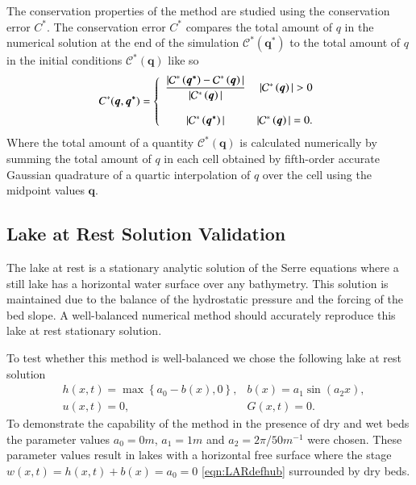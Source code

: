 \documentclass[times]{elsarticle}
\newcommand{\vecn}[1]{\boldsymbol{#1}}
\begin{document}
The conservation properties of the method are studied using the conservation error $C^*$. The conservation error $C^*$ compares the total amount of $q$ in the numerical solution at the end of the simulation $\mathcal{C}^*\left({\vecn{q^*}}\right)$ to the total amount of $q$ in the initial conditions $\mathcal{C}^*\left({\vecn{q}}\right)$ like so
\begin{equation*}
C^*(\vecn{q},\vecn{q^*}) =  \left\lbrace \begin{array}{c r} 
\dfrac{|\mathcal{C}^*\left({\vecn{q^*}}\right) - \mathcal{C}^*\left({\vecn{q}}\right)| }{|\mathcal{C}^*\left({\vecn{q}}\right)|} & |\mathcal{C}^*\left({\vecn{q}}\right)| > 0 \\ \\
|\mathcal{C}^*\left({\vecn{q^*}}\right)| & |\mathcal{C}^*\left({\vecn{q}}\right)| = 0  . \end{array}\right. 
\end{equation*}
Where the total amount of a quantity $\mathcal{C}^*\left({\vecn{q}}\right)$ is calculated numerically by summing the total amount of $q$ in each cell obtained by fifth-order accurate Gaussian quadrature of a quartic interpolation of $q$ over the cell using the midpoint values ${\vecn{q}}$. 

\subsection{Lake at Rest Solution Validation}
The lake at rest is a stationary analytic solution of the Serre equations where a still lake has a horizontal water surface over any bathymetry. This solution is maintained due to the balance of the hydrostatic pressure and the forcing of the bed slope. A well-balanced numerical method should accurately reproduce this lake at rest stationary solution.

To test whether this method is well-balanced we chose the following lake at rest solution
\begin{subequations}
	\begin{align}
	&h(x,t) = \max\left\lbrace a_0 - b(x), 0 \right\rbrace, & b(x) = a_1 \sin\left(a_2 x\right), \\
	&u(x,t) = 0 , 	&G(x,t) = 0.
	\end{align}
	\label{eqn:LARdefhub}
\end{subequations}
To demonstrate the capability of the method in the presence of dry and wet beds the parameter values $a_0 = 0m$, $a_1 = 1m$ and $a_2 = 2 \pi / 50 m^{-1} $ were chosen. These parameter values result in lakes with a horizontal free surface where the stage $w(x,t)= h(x,t) + b(x) =a_0= 0$ \eqref{eqn:LARdefhub} surrounded by dry beds.
\end{document}
